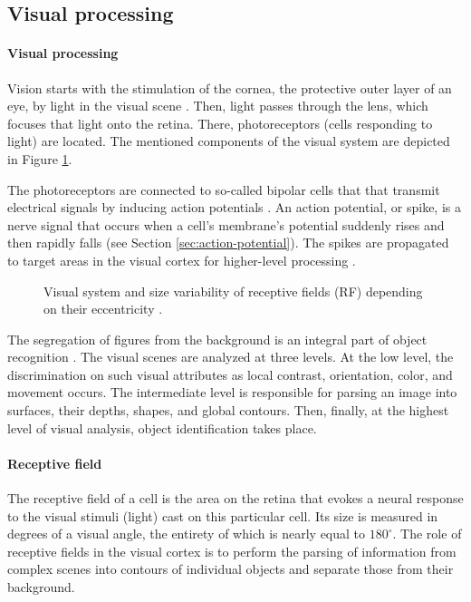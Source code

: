 \subsection{Visual processing}

\paragraph{Visual processing}

Vision starts with the stimulation of the cornea, the protective outer layer of an eye, by light in the visual scene \cite{KandelBook2003:26}. Then, light passes through the lens, which focuses that light onto the retina. There, photoreceptors (cells responding to light) are located. The mentioned components of the visual system are depicted in Figure \ref{fig:receptive-field}. 

The photoreceptors are connected to so-called bipolar cells that that transmit electrical signals by inducing action potentials \cite{IzhikevichBook2004:2}. An action potential, or spike, is a nerve signal that occurs when a cell's membrane's potential suddenly rises and then rapidly falls (see Section \ref{sec:action-potential}). The spikes are propagated to target areas in the visual cortex for higher-level processing \cite{KandelBook2003:26}.

\begin{figure}[!htp]
    \centering
    
    \caption[Visual system and size variability of receptive fields]{Visual system and size variability of receptive fields (RF) depending on their eccentricity \cite{KandelBook2003:25}.}
    \label{fig:receptive-field}
\end{figure}

The segregation of figures from the background is an integral part of object recognition \cite{KandelBook2003:25}. The visual scenes are analyzed at three levels. At the low level, the discrimination on such visual attributes as local contrast, orientation, color, and movement occurs. The intermediate level is responsible for parsing an image into surfaces, their depths, shapes, and global contours. Then, finally, at the highest level of visual analysis, object identification takes place.

\paragraph{Receptive field}

The receptive field of a cell is the area on the retina that evokes a neural response to the visual stimuli (light) cast on this particular cell. Its size is measured in degrees of a visual angle, the entirety of which is nearly equal to $180^\circ$. The role of receptive fields in the visual cortex is to perform the parsing of information from complex scenes into contours of individual objects and separate those from their background.

